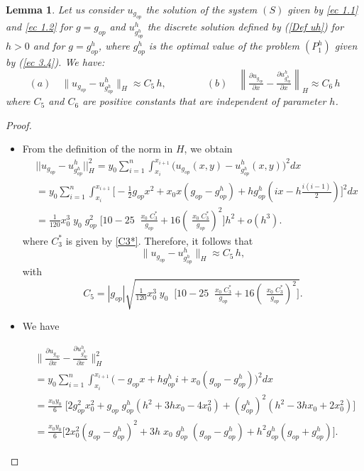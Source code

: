 \documentclass[11pt]{article}
\newcommand{\dee}{d}
\newcommand{\bint}{\displaystyle\int}
\newcommand\pder[2][]{\ensuremath{\tfrac{\partial#1}{\partial#2}}}
\newtheorem{Lemma}{Lemma}
\begin{document}
\begin{Lemma}\label{lema-dif norm ugop-uhghop}
 Let us consider $u_{g_{op}}$ the solution of { the system $(S)$ given by } \eqref{ec 1.1} and \eqref{ec 1.2} for $g= g_{op}$ and {$u^h_{g^h_{op}}$}
 the discrete solution defined by (\ref{Def uh}) for $h>0$ and for {$g=g^h_{op}$, where $g^h_{op}$}  is  the optimal value  of the problem ${(P^h_{1})}$ given by
 (\ref{ec 3.4}). We have: 
  $$   (a) \quad
  \lVert u_{g_{op}}- {u^h_{g^h_{op}}}    \rVert _H \approx C_5\, h,\qquad \qquad
  			        (b) \quad
  \left\lVert \pder[u_{g_{op}}]{x}-\pder[ {u^h_{g^h_{op}}}   ]{x}     \right\rVert _H \approx C_6\, h 
   $$
 \noindent where $C_5$ and $C_6$ are {positive constants that are independent of parameter $h$.}
   \end{Lemma}  

   \begin{proof}$ $
    \begin{itemize}
     \item[(a)] From the definition of the norm in $H$, we obtain 
      $$\begin{array}{ll}
   &  ||u_{g_{op}}-{u^h_{g^h_{op}}}   ||_{H}^2 =y_0 \displaystyle\sum\limits_{i=1}^n \bint_{x_i}^{x_{i+1}}  \Big(u_{g_{op}}(x,y)-{u^h_{g^h_{op}}}   (x,y)\Big)^2  \dee x\\ 
  & =y_0 \displaystyle\sum\limits_{i=1}^n \bint_{x_i}^{x_{i+1}} \Big[-\tfrac{1}{2} g_{op}x^2+x_0 x (g_{op}-{g^h_{op}})+ h {g^h_{op}}(i x-h\tfrac{i(i-1)}{2})\Big]^2  \dee x\\
  &= \tfrac{1}{120}x_0^3 \;y_0\; g_{op}^2 \;\Big[10-25 \; \;\tfrac{x_0 \; C_3^*}{g_{op}}+16 \left( \;\tfrac{x_0 \; C_3^*}{g_{op}}\right)^2\Big] h^2+ o(h^3).
     \end{array}$$
     where $C_3^*$ is given by \eqref{C3*}.
    Therefore, it follows that 
   $$  \lVert u_{g_{op}}- { u^h_{g^h_{op}}}    \rVert _H \approx C_5\, h,$$
   with $$C_5= |g_{op}| \sqrt{\tfrac{1}{120}x_0^3 \;y_0\;  \;\Big[10-25 \; \;\tfrac{x_0 \; C_3^*}{g_{op}}+16 \left( \;\tfrac{x_0 \; C_3^*}{g_{op}}\right)^2\Big]}.$$
     
     
     \item[(b)] We have
     
     
      $\begin{array}{ll}
    &  \Big\lVert \pder[u_{g_{op}}]{x}-\pder[ {u^h_{g^h_{op}}} ]{x} \Big\rVert  _H^2 \\[0.45cm]
    & =y_0 \displaystyle\sum\limits_{i=1}^n \bint_{x_i}^{x_{i+1}}  \Big(-g_{op}x+h {g^h_{op}}i+x_0(g_{op}-{g^h_{op}})\Big)^2  \dee x\\[0.45cm]
&     =  \tfrac{x_0 y_0}{6} \;\Big[2 g_{op}^2 x_0^2+g_{op}\;{g^h_{op}}(h^2+3hx_0-4x_0^2)+({g^h_{op}})^2(h^2-3hx_0+2x_0^2) \Big]\\[0.45cm]
&=\tfrac{x_0 y_0}{6} \Big[2 x_0^2 (g_{op} -{g^h_{op}})^2 + 
       3 h \;x_0\; {g^h_{op}}  \;(g_{op} - {g^h_{op}}) + h^2 {g^h_{op}}(g_{op} + {g^h_{op}})\Big]. 
        \end{array}$
        

\end{itemize}
\end{proof}
\end{document}
